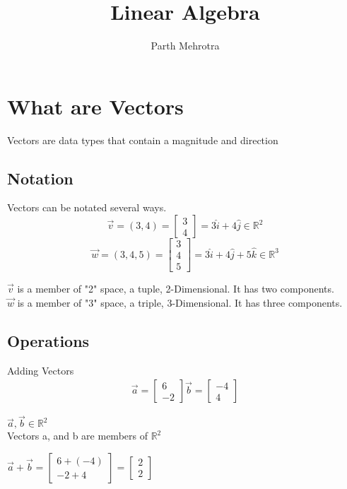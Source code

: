 \documentclass{article}
\title{Linear Algebra}
\author{Parth Mehrotra}
\begin{document}
	\maketitle
	\newpage
	
	\section{What are Vectors}
	Vectors are data types that contain a magnitude and direction

		\subsection{Notation}
			Vectors can be notated several ways. \\
			\[\vec{v} = (3, 4) = \begin{bmatrix} 3\\ 4 \end{bmatrix} = 3\hat{i} + 4\hat{j} \in \mathbb{R}^2 \]
			\[\vec{w} = (3, 4, 5) = \begin{bmatrix} 3\\ 4\\ 5\end{bmatrix} = 3\hat{i} + 4\hat{j} + 5\hat{k} \in \mathbb{R}^3 \]
			
			$\vec{v}$ is a member of "2" space, a tuple, 2-Dimensional. It has two components. \\
			$\vec{w}$ is a member of "3" space, a triple, 3-Dimensional. It has three components.
		\subsection{Operations}

			Adding Vectors
			\begin{align*}
				\vec{a} = \begin{bmatrix} 6 \\ -2\end{bmatrix}
				\vec{b} = \begin{bmatrix} -4 \\ 4\end{bmatrix}
			\end{align*}

			$\vec{a}, \vec{b} \in \mathbb{R}^2$ \\
			Vectors a, and b are members of $\mathbb{R}^2$

			$\vec{a} + \vec{b} = 
				\begin{bmatrix} 6 + (-4) \\ -2 + 4\end{bmatrix} = 
				\begin{bmatrix} 2 \\ 2 \end{bmatrix}$
		
\end{document}
